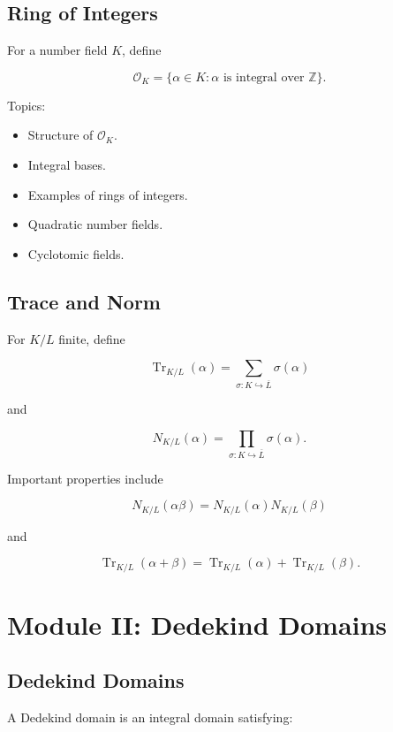 \documentclass[11pt]{article}
\begin{document}
\subsection{Ring of Integers}

For a number field $K$, define

\[
\mathcal{O}_K
=
\{\alpha\in K:\alpha
\text{ is integral over }\mathbb{Z}\}.
\]

Topics:

\begin{itemize}
    \item Structure of $\mathcal{O}_K$.
    \item Integral bases.
    \item Examples of rings of integers.
    \item Quadratic number fields.
    \item Cyclotomic fields.
\end{itemize}

\subsection{Trace and Norm}

For $K/L$ finite, define

\[
\operatorname{Tr}_{K/L}(\alpha)
=
\sum_{\sigma:K\hookrightarrow \overline{L}}\sigma(\alpha)
\]

and

\[
N_{K/L}(\alpha)
=
\prod_{\sigma:K\hookrightarrow \overline{L}}\sigma(\alpha).
\]

Important properties include

\[
N_{K/L}(\alpha\beta)
=
N_{K/L}(\alpha)N_{K/L}(\beta)
\]

and

\[
\operatorname{Tr}_{K/L}(\alpha+\beta)
=
\operatorname{Tr}_{K/L}(\alpha)
+
\operatorname{Tr}_{K/L}(\beta).
\]

\section{Module II: Dedekind Domains}

\subsection{Dedekind Domains}

A Dedekind domain is an integral domain satisfying:
\end{document}
